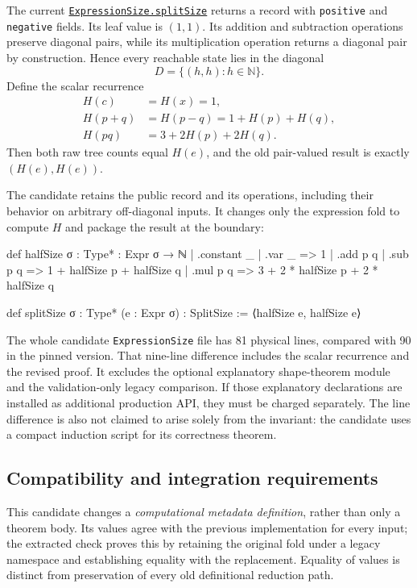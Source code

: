 \documentclass[11pt,letterpaper]{article}
\newcommand{\code}[1]{\texttt{\small #1}}
\newcommand{\N}{\mathbb{N}}
\newcommand{\source}[2]{\href{https://github.com/VladimirReshetnikov/ProveIt/blob/9d9d1123b39927d30363f1dcd53c23f0575c30ee/Computability/DiophantineConsistency/Lean/DiophantineConsistency/#1.lean}{\code{#1.#2}}}
\begin{document}
The current \source{ExpressionSize}{splitSize} returns a record with \code{positive} and \code{negative} fields. Its leaf value is $(1,1)$. Its addition and subtraction operations preserve diagonal pairs, while its multiplication operation returns a diagonal pair by construction. Hence every reachable state lies in the diagonal
\[
 D=\{(h,h):h\in\N\}.
\]
Define the scalar recurrence
\begin{align*}
 H(c)&=H(x)=1,\\
 H(p+q)&=H(p-q)=1+H(p)+H(q),\\
 H(pq)&=3+2H(p)+2H(q).
\end{align*}
Then both raw tree counts equal $H(e)$, and the old pair-valued result is exactly $(H(e),H(e))$.

The candidate retains the public record and its operations, including their behavior on arbitrary off-diagonal inputs. It changes only the expression fold to compute $H$ and package the result at the boundary:
\begin{Lean}
def halfSize {σ : Type*} : Expr σ → ℕ
  | .constant _ | .var _ => 1
  | .add p q | .sub p q => 1 + halfSize p + halfSize q
  | .mul p q => 3 + 2 * halfSize p + 2 * halfSize q

def splitSize {σ : Type*} (e : Expr σ) : SplitSize :=
  ⟨halfSize e, halfSize e⟩
\end{Lean}

The whole candidate \code{ExpressionSize} file has 81 physical lines, compared with 90 in the pinned version. That nine-line difference includes the scalar recurrence and the revised proof. It excludes the optional explanatory shape-theorem module and the validation-only legacy comparison. If those explanatory declarations are installed as additional production API, they must be charged separately. The line difference is also not claimed to arise solely from the invariant: the candidate uses a compact induction script for its correctness theorem.

\subsection{Compatibility and integration requirements}

This candidate changes a \emph{computational metadata definition}, rather than only a theorem body. Its values agree with the previous implementation for every input; the extracted check proves this by retaining the original fold under a legacy namespace and establishing equality with the replacement. Equality of values is distinct from preservation of every old definitional reduction path.
\end{document}
